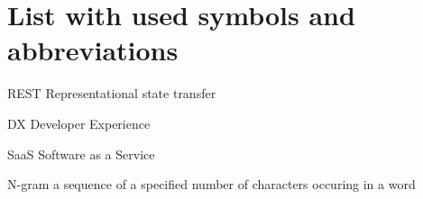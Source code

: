
\section*{List with used symbols and abbreviations}

\begin{abbreviations}
\item[REST] Representational state transfer\cite{fielding2000architectural}
\item[DX] Developer Experience
\item[SaaS] Software as a Service
\item[N-gram] a sequence of a specified number of characters occuring in a word\cite{kimbrell1988searching}
\end{abbreviations}
